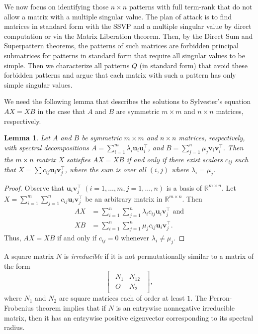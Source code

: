 \documentclass[preprint,12pt]{elsarticle}
\newcommand{\trans  }{^\top}
\newtheorem{lemma}[theorem]{Lemma}
\begin{document}
We now focus on identifying those $n\times n$
patterns with full term-rank that do not allow a matrix with a multiple singular value.  The plan of attack is to find matrices in standard form with the SSVP and a multiple singular value by direct computation or via the Matrix Liberation theorem. Then, by the Direct Sum and Superpattern theorems, the patterns of such matrices are  forbidden  principal submatrices for patterns in standard form  that require all singular values to be simple. Then we  characterize all patterns $Q$ (in standard form) that avoid these  forbidden patterns and argue that each matrix with such a pattern has only simple singular values. 
 

We need the following lemma that describes the solutions to Sylvester's equation $AX=XB$
in the case that $A$ and $B$ are symmetric $m\times m$ and $n\times n$ matrices, respectively. 
\begin{lemma}
\label{sylvester}
Let $A$ and $B$ be symmetric $m\times m$ and $n\times n$ 
matrices, respectively, with spectral decompositions
$A=\sum_{i=1}^m \lambda_i \mathbf u_i \mathbf u_i\trans$, 
and 
$B=\sum_{j=1}^n \mu_j\mathbf v_i \mathbf v_i\trans$.  Then the $m\times n$ matrix $X$ 
satisfies $AX=XB$ if and only if there exist scalars
$c_{ij}$ such that $X=\sum c_{ij} \mathbf u_i \mathbf v_j\trans$, where the sum is over all $(i,j)$ where 
$\lambda_i=\mu_j$.
\end{lemma}

\begin{proof} 
Observe that $\mathbf u_i\mathbf v_j\trans$ $(i=1,\ldots, m, j=1,\ldots, n)$
is a basis of $\mathbb{R}^{m\times n}$.  Let $X= \sum_{i=1}^m\sum_{j=1}^n
c_{ij} \mathbf u_i \mathbf v_j\trans$ be an arbitrary matrix in $\mathbb{R}^{m\times n}$.
Then 
\begin{align}
AX&= \sum_{i=1}^n \sum_{j=1}^n
\lambda_i c_{ij}  \mathbf u_i \mathbf v_j\trans \mbox{ and}\\
XB&= \sum_{i=1}^n \sum_{j=1}^n \mu_j c_{ij}  \mathbf u_i \mathbf v_j\trans. 
\end{align} 
Thus, $AX=XB$ if and only if $c_{ij}=0$ 
whenever $\lambda_i\neq \mu_j$. 
\end{proof}


A square matrix $N$ is \textit{irreducible} if it is not permutationally similar to a matrix of the form 
\[ 
\begin{bmatrix}
\begin{array}{c|c}
    N_{1} & N_{12} \\ \hline
    O & N_{2}
    \end{array}
\end{bmatrix},
\]
where $N_1$ and $N_2$ are square matrices each of order at least $1$.  The Perron-Frobenius theorem 
implies that if $N$ is an entrywise nonnegative 
irreducible matrix, then it has an entrywise positive 
eigenvector corresponding to its spectral radius. 
\end{document}
